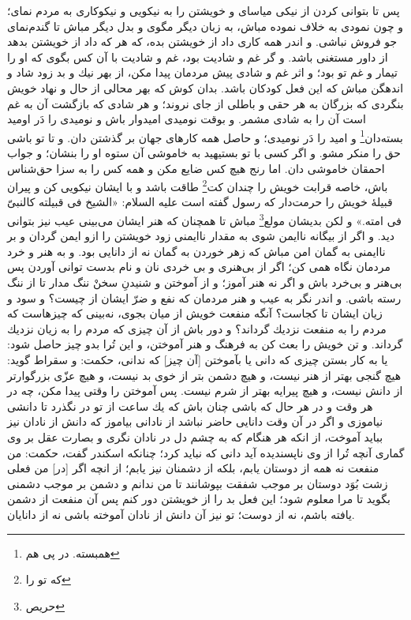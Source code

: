 پس تا بتوانى كردن از نيكى مياساى و خويشتن را به نيكويى و نيكوكارى به مردم نماى؛ و چون نمودى به خلاف نموده مباش، به زبان ديگر مگوى و بدل ديگر مباش تا گندم‌نماى جو فروش نباشى. و اندر همه كارى داد از خويشتن بده، كه هر كه داد از خويشتن بدهد از داور مستغنى باشد. و گر غم و شاديت بود، غم و  شاديت با آن كس بگوى كه او را تيمار و غم تو بود؛ و اثر غم و شادى پيش مردمان پيدا مكن، از بهر نيك و بد زود شاد و اندهگن مباش كه اين فعل كودكان باشد. بدان كوش كه بهر محالى از حال و نهاد خويش بنگردى كه بزرگان به هر حقى و باطلى از جاى نروند؛ و هر شادى كه بازگشت آن به غم است آن را به شادى مشمر. و بوقت نوميدى اميدوار باش و نوميدى را دَر اوميد بسته‌دان\footnote{همبسته. در پی هم} و اميد را دَر نوميدى؛ و حاصل همه كارهاى جهان بر گذشتن دان. و تا تو باشى حق را منكر مشو. و اگر كسى با تو بستيهيد به خاموشى آن ستوه او را بنشان؛ و جواب احمقان خاموشى دان. اما رنج هيچ كس ضايع مكن و همه كس را به سزا حق‌شناس باش، خاصه قرابت خويش را چندان كت\footnote{که تو را} طاقت باشد و با ايشان نيكويى كن و پيران قبيلۀ خويش را حرمت‌دار كه رسول گفته است عليه السلام: «الشيخ فى قبيلته كالنبىّ فى امته.» و لكن بديشان مولع\footnote{حریص} مباش تا همچنان كه هنر ايشان مى‌بينى عيب نيز بتوانى ديد. و اگر از بيگانه ناايمن شوى به مقدار ناايمنى زود خويشتن را ازو ايمن گردان و بر ناايمنى به گمان امن مباش كه زهر خوردن به گمان نه از دانايى بود. و به هنر و خرد مردمان نگاه همى كن؛ اگر از بى‌هنرى و بى خردى نان و نام بدست توانى آوردن پس بى‌هنر و بى‌خرد باش و اگر نه هنر آموز؛ و از آموختن و شنيدنِ سخنْ ننگ مدار تا از ننگ رسته باشى. و اندر نگر به عيب و هنر مردمان كه نفع و ضرّ ايشان از چيست‌؟ و سود و زيان ايشان تا كجاست‌؟ آنگه منفعت خويش از ميان بجوى، نه‌بينى كه چيزهاست كه مردم را به منفعت نزديك گرداند؟ و دور باش از آن چيزى كه مردم را به زيان نزديك گرداند. و تن خويش را بعث كن به فرهنگ و هنر آموختن، و اين تُرا بدو چيز حاصل شود: يا به كار بستن چيزى كه دانى يا بآموختن [آن چيز] كه ندانى، حكمت: و سقراط گويد: هيچ گنجى بهتر از هنر نيست، و هيچ دشمن بتر از خوى بد نيست، و هيچ عزّى بزرگوارتر از دانش نيست، و هيچ پيرايه بهتر از شرم نيست. پس آموختن را وقتى پيدا مكن، چه در هر وقت و در هر حال كه باشى چنان باش كه يك ساعت از تو در نگذرد تا دانشى نياموزى و اگر در آن وقت دانايى حاضر نباشد از نادانى بياموز كه دانش از نادان نيز ببايد آموخت، از انكه هر هنگام كه به چشم دل در نادان نگرى و بصارت عقل بر وى گمارى آنچه تُرا از وى ناپسنديده آيد دانى كه نبايد كرد؛ چنانكه اسكندر گفت، حكمت: من منفعت نه همه از دوستان يابم، بلكه از دشمنان نيز يابم؛ از انچه اگر [در] من فعلى زشت بُوَد دوستان بر موجب شفقت بپوشانند تا من ندانم و دشمن بر موجب دشمنى بگويد تا مرا معلوم شود؛ اين فعل بد را از خويشتن دور كنم پس آن منفعت از دشمن يافته باشم، نه از دوست؛ تو نيز آن دانش از نادان آموخته باشى نه از دانايان.

